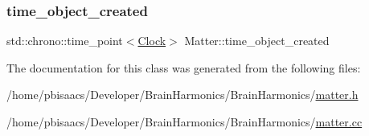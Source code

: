 \mbox{\label{classMatter_abce05beb1ad51f3b4bddefcd35731a2f}} 
\subsubsection{\texorpdfstring{time\+\_\+object\+\_\+created}{time\_object\_created}}
{\footnotesize\ttfamily std\+::chrono\+::time\+\_\+point$<$\mbox{\hyperlink{universe_8h_a0ef8d951d1ca5ab3cfaf7ab4c7a6fd80}{Clock}}$>$ Matter\+::time\+\_\+object\+\_\+created\hspace{0.3cm}{\ttfamily [private]}}



The documentation for this class was generated from the following files\+:\begin{DoxyCompactItemize}
\item 
/home/pbisaacs/\+Developer/\+Brain\+Harmonics/\+Brain\+Harmonics/\mbox{\hyperlink{matter_8h}{matter.\+h}}\item 
/home/pbisaacs/\+Developer/\+Brain\+Harmonics/\+Brain\+Harmonics/\mbox{\hyperlink{matter_8cc}{matter.\+cc}}\end{DoxyCompactItemize}
